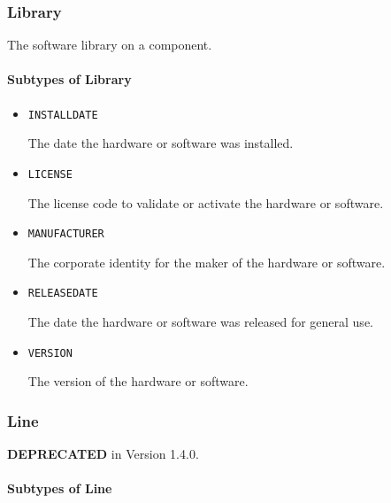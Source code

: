 \FloatBarrier

\subsubsection{Library}
\label{sec:Library}



The software library on a component.



\paragraph{Subtypes of Library}\mbox{}
\label{sec:Subtypes of Library}

\begin{itemize}

\item \texttt{INSTALL\textunderscore DATE}


The date the hardware or software was installed.

\item \texttt{LICENSE}


The license code to validate or activate the hardware or software.

\item \texttt{MANUFACTURER}


The corporate identity for the maker of the hardware or software.


\item \texttt{RELEASE\textunderscore DATE}


The date the hardware or software was released for general use.


\item \texttt{VERSION}


The version of the hardware or software.


\end{itemize}

\subsubsection{Line}
\label{sec:Line}



\textbf{DEPRECATED} in Version 1.4.0.


\paragraph{Subtypes of Line}\mbox{}
\label{sec:Subtypes of Line}

